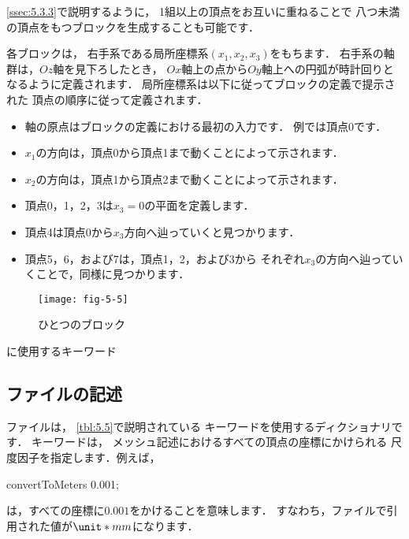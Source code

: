 \autoref{ssec:5.3.3}で説明するように，
1組以上の頂点をお互いに重ねることで
八つ未満の頂点をもつブロックを生成することも可能です．

各ブロックは，
右手系である局所座標系$(x_{1}, x_{2}, x_{3})$をもちます．
右手系の軸群は，$Oz$軸を見下ろしたとき，
$Ox$軸上の点から$Oy$軸上への円弧が時計回りとなるように定義されます．
局所座標系は以下に従ってブロックの定義で提示された
頂点の順序に従って定義されます．
\begin{itemize}
 \label{p:U-130}
 \item 軸の原点はブロックの定義における最初の入力です．
       例では頂点0です．
 \item $x_{1}$の方向は，頂点0から頂点1まで動くことによって示されます．
 \item $x_{2}$の方向は，頂点1から頂点2まで動くことによって示されます．
 \item 頂点0，1，2，3は$x_{3} = 0$の平面を定義します．
 \item 頂点4は頂点0から$x_{3}$方向へ辿っていくと見つかります．
 \item 頂点5，6，および7は，頂点1，2，および3から
       それぞれ$x_{3}$の方向へ辿っていくことで，同様に見つかります．
\end{itemize}


\begin{figure}[ht]
 \texttt{[image: fig-5-5]}
 \caption{ひとつのブロック}
 \label{fig:5.5}
\end{figure}


\begin{table}[ht]
 
 \caption{に使用するキーワード}
 \label{tbl:5.5}
\end{table}


\subsection{ファイルの記述}
\label{ssec:5.3.1}
ファイルは，
\autoref{tbl:5.5}で説明されている
キーワードを使用するディクショナリです．
%
%
キーワードは，
メッシュ記述におけるすべての頂点の座標にかけられる
尺度因子を指定します．例えば，
\begin{OFverbatim}[file]
convertToMeters 0.001;
\end{OFverbatim}
は，すべての座標に$0.001$をかけることを意味します．
すなわち，ファイルで引用された値が$\unit*{mm}$になります．


